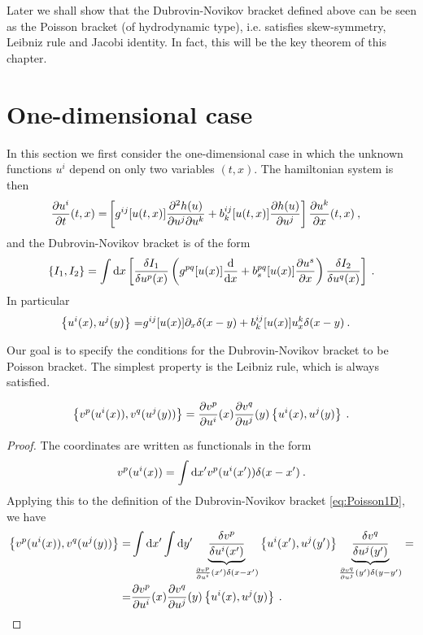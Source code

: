 Later we shall show that the Dubrovin-Novikov bracket defined above can be seen as the Poisson bracket (of hydrodynamic type), i.e. satisfies  skew-symmetry, Leibniz rule and Jacobi identity. In fact, this will be the key theorem of this chapter.

\section{One-dimensional case}

In this section we first consider the one-dimensional case in which the unknown functions $u^i$ depend on only two variables $(t,x)$. The hamiltonian system is then
\begin{align}
    \frac{\partial u^i}{\partial t} (t,x) =&
    \left[ g^{ij} [u(t,x)] \frac{\partial^2 h(u)}{\partial u^j \partial u^k} + b_k^{ij} [u(t,x)] \frac{\partial h(u)}{\partial u^j} \right] \frac{\partial u^k}{\partial x}(t,x) \:,
\end{align}
and the Dubrovin-Novikov bracket is of the form
\begin{align}
    \left \lbrace I_1,I_2 \right \rbrace = \int \mathrm{d} x
    \left[ \frac{\delta I_1}{\delta u^p(x)} \left( g^{pq}[u(x)] \frac{\mathrm{d}}{\mathrm{d}x} + b^{pq}_s[u(x)] \frac{\partial u^s}{\partial x} \right) \frac{\delta I_2}{\delta u^q(x)} \right] \:.
\end{align}
In particular
\begin{align}
    \label{eq:Poisson1D}
    \left \lbrace u^i(x), u^j(y) \right \rbrace =& g^{ij} [u(x)] \partial_x \delta(x-y) + b_k^{ij} [u(x)] u^k_x \delta(x-y) \:. 
\end{align}

Our goal is to specify the conditions for the Dubrovin-Novikov bracket to be Poisson bracket. The simplest property is the Leibniz rule, which is always satisfied.

\begin{proposition}
    \begin{align}
        \label{eq:transformace-zavorka}
        \left \lbrace v^p(u^i(x)),v^q(u^j(y)) \right \rbrace = \frac{\partial v^p}{\partial u^i}(x) \frac{\partial v^q}{\partial u^j}(y) \left \lbrace u^i(x),u^j(y) \right \rbrace \:. 
    \end{align}
\end{proposition}
\begin{proof}
    The coordinates are written as functionals in the form
    \begin{align}
        v^p(u^i(x)) = \int \mathrm{d} x' v^p(u^i(x')) \delta (x-x') \:.
    \end{align}
    Applying this to the definition of the Dubrovin-Novikov bracket \eqref{eq:Poisson1D}, we have
    \begin{align}
        \left \lbrace v^p(u^i(x)),v^q(u^j(y)) \right \rbrace 
        =& \int \mathrm{d} x' \int \mathrm{d} y' \underbrace{\frac{\delta v^p}{\delta u^i(x')} }_{\frac{\partial v^p}{\partial u^i}(x') \delta(x-x')} \left \lbrace u^i(x'),u^j(y') \right \rbrace \underbrace{\frac{\delta v^q}{\delta u^j(y')} }_{\frac{\partial v^q}{\partial u^j}(y') \delta(y-y')}
        = \\ =& \frac{\partial v^p}{\partial u^i}(x) \frac{\partial v^q}{\partial u^j}(y) \left \lbrace u^i(x),u^j(y) \right \rbrace \:.
    \end{align}
\end{proof}

